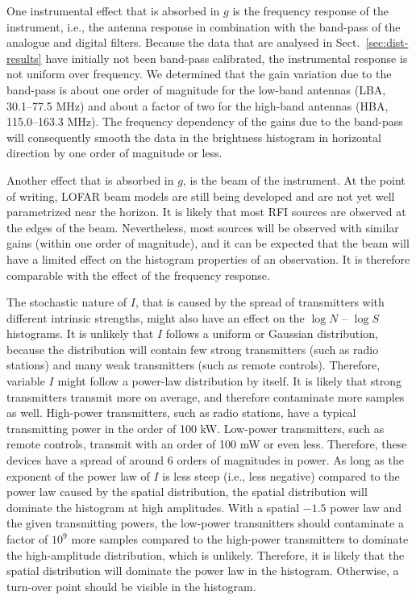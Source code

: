 \documentclass[useAMS,usenatbib]{mn2e}
\begin{document}
One instrumental effect that is absorbed in $g$ is the frequency response of the instrument, i.e., the antenna response in combination with the band-pass of the analogue and digital filters. Because the data that are analysed in Sect.~\ref{sec:dist-results} have initially not been band-pass calibrated, the instrumental response is not uniform over frequency. We determined that the gain variation due to the band-pass is about one order of magnitude for the low-band antennas (LBA, 30.1--77.5 MHz) and about a factor of two for the high-band antennas (HBA, 115.0--163.3 MHz). The frequency dependency of the gains due to the band-pass will consequently smooth the data in the brightness histogram in horizontal direction by one order of magnitude or less.

Another effect that is absorbed in $g$, is the beam of the instrument. At the point of writing, LOFAR beam models are still being developed and are not yet well parametrized near the horizon. It is likely that most RFI sources are observed at the edges of the beam. Nevertheless, most sources will be observed with similar gains (within one order of magnitude), and it can be expected that the beam will have a limited effect on the histogram properties of an observation. It is therefore comparable with the effect of the frequency response.

The stochastic nature of $I$, that is caused by the spread of transmitters with different intrinsic strengths, might also have an effect on the $\log N$ -- $\log S$ histograms. It is unlikely that $I$ follows a uniform or Gaussian distribution, because the distribution will contain few strong transmitters (such as radio stations) and many weak transmitters (such as remote controls). Therefore, variable $I$ might follow a power-law distribution by itself. It is likely that strong transmitters transmit more on average, and therefore contaminate more samples as well. High-power transmitters, such as radio stations, have a typical transmitting power in the order of 100 kW. Low-power transmitters, such as remote controls, transmit with an order of 100 mW or even less. Therefore, these devices have a spread of around 6 orders of magnitudes in power. As long as the exponent of the power law of $I$ is less steep (i.e., less negative) compared to the power law caused by the spatial distribution, the spatial distribution will dominate the histogram at high amplitudes. With a spatial $-1.5$ power law and the given transmitting powers, the low-power transmitters should contaminate a factor of $10^9$ more samples compared to the high-power transmitters to dominate the high-amplitude distribution, which is unlikely. Therefore, it is likely that the spatial distribution will dominate the power law in the histogram. Otherwise, a turn-over point should be visible in the histogram.
\end{document}
